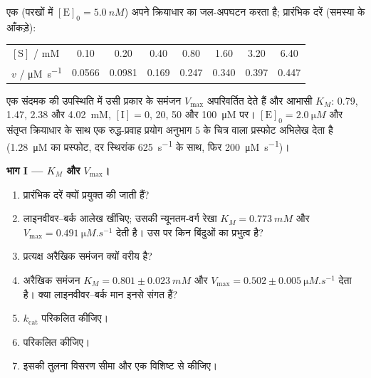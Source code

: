 \begin{problem}
\label{pb:b3:complex-kinetics:1}
एक  (परखों में $[\mathrm E]_0 = \qty{5.0}{nM}$) अपने क्रियाधार का जल-अपघटन करता है; प्रारंभिक दरें
(समस्या के आँकड़े):
\begin{center}\small
\begin{tabular}{lccccccc}
\hline
$[\mathrm S]$ / mM & 0.10 & 0.20 & 0.40 & 0.80 & 1.60 & 3.20 & 6.40 \\
$v$ / \unit{\micro M.s^{-1}} & 0.0566 & 0.0981 & 0.169 & 0.247 & 0.340 & 0.397 & 0.447 \\ \hline
\end{tabular}
\end{center}
एक संदमक की उपस्थिति में उसी प्रकार के समंजन $V_{\max}$ अपरिवर्तित देते हैं और
आभासी $K_M$: 0.79, 1.47, 2.38 और \qty{4.02}{mM}, $[\mathrm I] = 0$, 20, 50 और
\qty{100}{\micro M} पर। $[\mathrm E]_0 = \qty{2.0}{\micro M}$ और संतृप्त क्रियाधार के साथ एक रुद्ध-प्रवाह प्रयोग
अनुभाग 5 के चित्र वाला प्रस्फोट अभिलेख देता है (\qty{1.28}{\micro M} का प्रस्फोट,
दर स्थिरांक \qty{625}{s^{-1}} के साथ, फिर \qty{200}{\micro M.s^{-1}})।

\medskip\noindent\textbf{भाग I --- $K_M$ और $V_{\max}$।}
\begin{enumerate}
  \item प्रारंभिक दरें क्यों प्रयुक्त की जाती हैं?
  \item लाइनवीवर--बर्क आलेख खींचिए; उसकी न्यूनतम-वर्ग रेखा $K_M =
        \qty{0.773}{mM}$ और $V_{\max} = \qty{0.491}{\micro M.s^{-1}}$ देती है। उस पर किन बिंदुओं का प्रभुत्व है?
  \item प्रत्यक्ष अरैखिक समंजन क्यों वरीय है?
  \item अरैखिक समंजन $K_M = 0.801 \pm \qty{0.023}{mM}$ और $V_{\max} = 0.502 \pm
        \qty{0.005}{\micro M.s^{-1}}$ देता है। क्या लाइनवीवर--बर्क मान इनसे संगत हैं?
  \item $k_{\mathrm{cat}}$ परिकलित कीजिए।
  \item {} परिकलित कीजिए।
  \item इसकी तुलना विसरण सीमा और एक विशिष्ट  से कीजिए।
\end{enumerate}


\end{problem}
